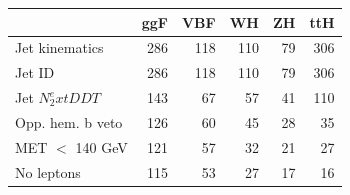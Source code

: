 \begin{tabular}{lrrrrr}
\toprule
 & ggF & VBF & WH & ZH & ttH \\
\midrule
Jet kinematics & 286 & 118 & 110 & 79 & 306 \\
Jet ID & 286 & 118 & 110 & 79 & 306 \\
Jet $N_2^	ext{DDT}$ & 143 & 67 & 57 & 41 & 110 \\
Opp. hem. b veto & 126 & 60 & 45 & 28 & 35 \\
MET $<$ 140 GeV & 121 & 57 & 32 & 21 & 27 \\
No leptons & 115 & 53 & 27 & 17 & 16 \\
\bottomrule
\end{tabular}
